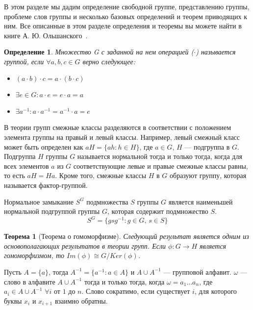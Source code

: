 \documentclass[14pt]{matmex-diploma-custom}
\newtheorem{thm}{Теорема}[subsection]
\newtheorem{defn}{Определение}[subsection]
\begin{document}
В этом разделе мы дадим определение свободной группе, представлению группы,
проблеме слов группы и несколько базовых определений и теорем приводящих к ним. Все описанные в этом
разделе определения и теоремы вы можете найти в книге А. Ю. Ольшанского~\cite{geomTheoryGroup}.

\begin{defn}
Множество G с заданной на нем операцией ($ \cdot $) называется группой, если $ \forall a, b, c \in G $
верно следующее:
\begin{itemize}
\item $(a \cdot b) \cdot c = a \cdot (b \cdot c)$
\item $\exists e \in G : a \cdot e = e \cdot a = a$
\item $\exists a^{-1} : a \cdot a^{-1} = a^{-1} \cdot a = e$
\end{itemize}
\end{defn}

В теории групп смежные классы разделяются в соответствии с положением элемента группы
на правый и левый классы. 
Например, левый смежный класс может быть определен как $aH = \{ah: h \in H \}$,
где $ a \in G $, $ H $ --- подгруппа в $G$.
Подгруппа $ H $ группы $ G $ называется нормальной тогда и только тогда, когда для всех
элементов $ a $ из $ G $ соответствующие левые и правые смежные классы равны,
то есть $ aH = Ha $. Кроме того, смежные классы $ H $ в $ G $ образуют группу, которая
называется фактор-группой.

Нормальное замыкание $ S^G $ подмножества $ S $ группы $ G $ является наименьшей нормальной подгруппой
группы $ G $, которая содержит подмножество $ S $.
\begin{equation}
    S^G = \{ gsg^{-1} : g \in G,\, s \in S \}
\end{equation}

\begin{thm}[Теорема о гомоморфизме] \label{gomomorphThm}
Следующий результат является одним из основополагающих результатов в теории групп.
Если $ \phi: G \to H $ является гомоморфизмом, то $ Im (\phi) \cong G/Ker (\phi) $.
\end{thm}

Пусть $ A = \{a\} $, тогда $ A^{-1} = \{a^{-1}: a \in A\} $ и $ A \cup A^{-1} $ --- групповой алфавит.
$ \omega $ --- слово в алфавите $ A \cup A^{-1} $ тогда и только тогда, когда $\omega = a_1 \dots a_n$,
где $ a_i \in A \cup A^{-1}$ $\forall i$ от $1$ до $n$.
Слово сократимо, если существует $ i $, для которого буквы $ x_i $ и $ x_{i + 1} $ взаимно обратны.
\end{document}
